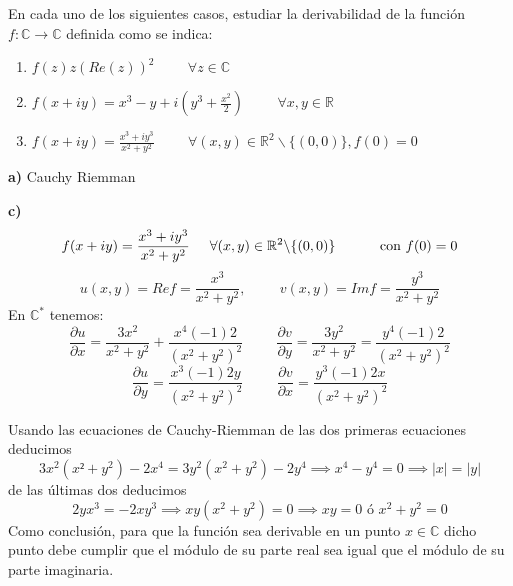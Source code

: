 \begin{ejer}
	En cada uno de los siguientes casos, estudiar la derivabilidad de la función $f:\mathbb{C} \rightarrow\mathbb{C}$ definida como se indica:
	\begin{enumerate}[label=(\alph*)]
		\item $f(z)  z(Re(z))^2 \hspace{1cm}\forall z\in\mathbb{C}$
		\item $f(x+iy) = x^3 -y+i\left( y^3 +\frac{x^2}{2} \right) \hspace{1cm} \forall x,y\in\mathbb{R}$
		\item $f(x+iy) = \frac{x^3+iy^3}{x^2+y^2} \hspace{1cm} \forall (x,y)\in\mathbb{R}^2\backslash\{(0,0)\}, f(0)=0$
	\end{enumerate}	
\end{ejer}
\begin{sol}

\textbf{a)}
Cauchy Riemman




\textbf{c)}
$$f(x+iy) = \frac{x^3+iy^3}{x^2+y^2}\hspace{0.5cm} \forall (x,y)\in\mathbb{R}^2 \backslash \{ (0,0) \}\hspace{1cm}\text{ con } f(0)=0$$
$$u(x,y) = Re f = \frac{x^3}{x^2+y^2}, \hspace{1cm} v(x,y) = Imf = \frac{y^3}{x^2+y^2}$$
En $\mathbb{C}^{\ast}$ tenemos:
$$ \frac{\partial u}{\partial x} = \frac{3x^2}{x^2+y^2} + \frac{x^4(-1)2}{(x^2+y^2)^2} \hspace{1cm}
\frac{\partial v}{\partial y} = \frac{3y^2}{x^2+y^2} = \frac{y^4(-1)2}{(x^2+y^2)^2}$$
$$ \frac{\partial u}{\partial y} = \frac{x^3 (-1)2y}{(x^2+y^2)^2} \hspace{1cm}
\frac{\partial v}{\partial x} = \frac{y^3(-1)2x}{(x^2+y^2)^2}$$

Usando las ecuaciones de Cauchy-Riemman de las dos primeras ecuaciones deducimos
$$3x^2(x²+y^2) - 2x^4 = 3y^2(x^2+y^2)-2y^4 \implies x^4-y^4 = 0 \implies |x|=|y|$$
de las últimas dos deducimos
$$2yx^3=-2xy^3 \implies xy(x^2+y^2) = 0 \implies xy=0 \text{ ó } x^2+y^2=0$$
Como conclusión, para que la función sea derivable en un punto $x\in\mathbb{C}$ dicho punto debe cumplir que el módulo de su parte real sea igual que el módulo de su parte imaginaria.

\end{sol}




